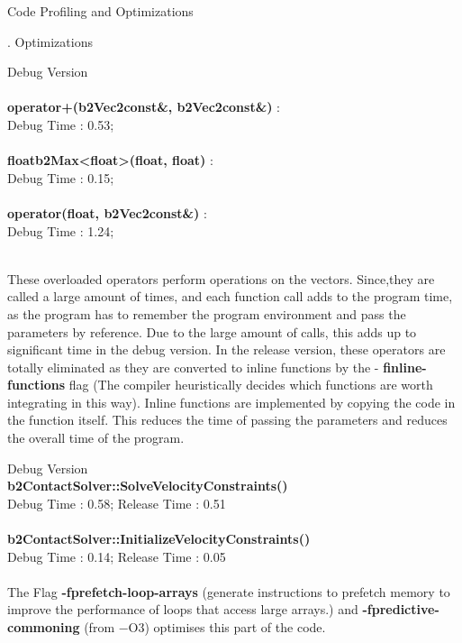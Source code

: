 \documentclass[a4paper,11pt]{resume}
\begin{document}
\begin{rSection}{{\heading Code Profiling and Optimizations}}
\begin{rSubsection}{{. Optimizations}}{}{}{}
\begin{rSubsection}{{ Debug Version}}{}{}{}
\\ \\
\textbf{operator+(b2Vec2const\&, b2Vec2const\&)} : \\
Debug Time : 0.53;  \\ \\
\textbf{floatb2Max\textless  float\textgreater (float, float)} : \\ 
Debug Time : 0.15; \\ \\
\textbf{operator\text{*}(float, b2Vec2const\&) } : \\
Debug Time : 1.24; 
\\ \\
\begin{rSubsection}{}{}{}{}
These overloaded operators perform operations on the vectors. Since,they are called a large amount of times, and each function call adds to the program time, as the program has to remember the program environment and pass the parameters by reference. Due to the large amount of calls, this adds up to significant time in the debug version. In the release version, these operators are totally eliminated as they are converted to inline functions by the - \textbf{finline-functions} flag (The compiler heuristically decides which functions are worth integrating in this way). Inline functions are implemented by copying the code in the function itself. This reduces the time of passing the parameters and reduces the overall time of the program.
\\
\end{rSubsection}
\end{rSubsection}
\begin{rSubsection}{{ Debug Version}}{}{}{}
\\
\textbf{b2ContactSolver::SolveVelocityConstraints() }\\
Debug Time : 0.58; Release Time : 0.51 \\ \\
\textbf{b2ContactSolver::InitializeVelocityConstraints() } \\
Debug Time : 0.14; Release Time : 0.05 \\ \\
The Flag \textbf{-fprefetch-loop-arrays} (generate instructions to prefetch memory to improve the performance of loops that access large arrays.) and \textbf{-fpredictive-commoning} (from −O3) optimises this part of the code. \\ \\
\end{rSubsection}

\end{rSubsection}
\end{rSection}
\end{document}
